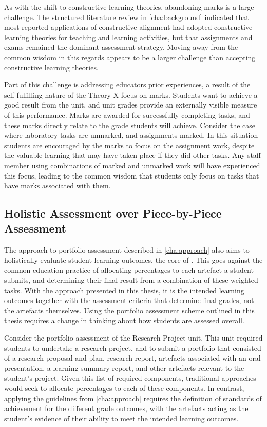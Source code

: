 As with the shift to constructive learning theories, abandoning marks is a large challenge. The structured literature review in \cref{cha:background} indicated that most reported applications of constructive alignment had adopted constructive learning theories for teaching and learning activities, but that assignments and exams remained the dominant assessment strategy. Moving away from the common wisdom in this regards appears to be a larger challenge than accepting constructive learning theories.

Part of this challenge is addressing educators prior experiences, a result of the self-fulfilling nature of the Theory-X focus on marks. Students want to achieve a good result from the unit, and unit grades provide an externally visible measure of this performance. Marks are awarded for successfully completing tasks, and these marks directly relate to the grade students will achieve. Consider the case where laboratory tasks are unmarked, and assignments marked. In this situation students are encouraged by the marks to focus on the assignment work, despite the valuable learning that may have taken place if they did other tasks. Any staff member using combinations of marked and unmarked work will have experienced this focus, leading to the common wisdom that students only focus on tasks that have marks associated with them.


\subsection{Holistic Assessment over Piece-by-Piece Assessment} %
\label{sub:holistic_assessment_over_piece_by_piece_assessment}

The approach to portfolio assessment described in \cref{cha:approach} also aims to holistically evaluate student learning outcomes, the core of . This goes against the common education practice of allocating percentages to each artefact a student submits, and determining their final result from a combination of these weighted tasks. With the approach presented in this thesis, it is the intended learning outcomes together with the assessment criteria that determine final grades, not the artefacts themselves. Using the portfolio assessment scheme outlined in this thesis requires a change in thinking about how students are assessed overall.

Consider the portfolio assessment of the Research Project unit. This unit required students to undertake a research project, and to submit a portfolio that consisted of a research proposal and plan, research report, artefacts associated with an oral presentation, a learning summary report, and other artefacts relevant to the student's project. Given this list of required components, traditional approaches would seek to allocate percentages to each of these components. In contrast, applying the guidelines from \cref{cha:approach} requires the definition of standards of achievement for the different grade outcomes, with the artefacts acting as the student's evidence of their ability to meet the intended learning outcomes.

